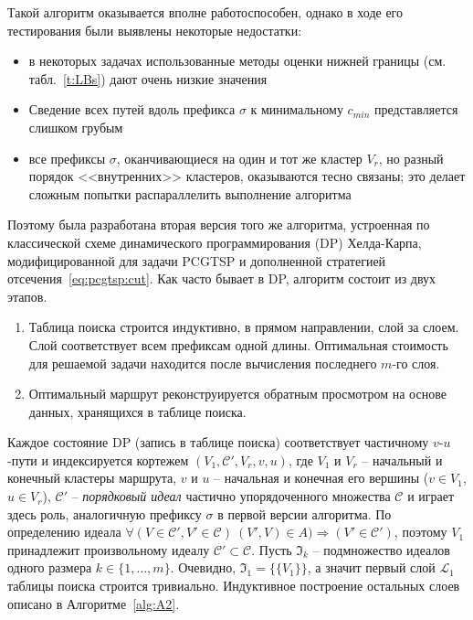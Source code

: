 Такой алгоритм оказывается вполне работоспособен,
однако в ходе его тестирования были выявлены некоторые недостатки:
\begin{itemize}
    \item
    в некоторых задачах использованные методы
    оценки нижней границы
    (см. табл.~\ref{t:LBs})
    дают очень низкие значения
    \item
    Сведение всех путей вдоль префикса $\sigma$
    к минимальному $c_{min}$
    представляется слишком грубым
    \item
    все префиксы $\sigma$,
    оканчивающиеся на один и тот же
    кластер $V_r$,
    но разный порядок <<внутренних>> кластеров,
    оказываются тесно связаны;
    это делает сложным попытки распараллелить
    выполнение алгоритма
\end{itemize}
Поэтому была разработана вторая версия того же алгоритма,
устроенная по классической схеме
динамического программирования (DP)
Хелда-Карпа,
модифицированной для задачи PCGTSP
и дополненной стратегией отсечения~\eqref{eq:pcgtsp:cut}.
Как часто бывает в DP,
алгоритм состоит из двух этапов.
\begin{enumerate}
  \item
  Таблица поиска строится индуктивно,
  в прямом направлении,
  слой за слоем.
  Слой соответствует всем префиксам одной длины.
  Оптимальная стоимость для решаемой задачи
  находится после вычисления последнего $m$-го слоя.
  \item
  Оптимальный маршрут реконструируется обратным просмотром
  на основе данных,
  хранящихся в таблице поиска.
\end{enumerate}

Каждое состояние DP
(запись в таблице поиска)
соответствует частичному
$v$-$u$-пути
и индексируется кортежем
$(V_1, \mathcal C',V_r,v, u)$, где
$V_1$ и $V_r$ -- начальный и конечный кластеры маршрута,
$v$ и $u$ -- начальная и конечная его вершины ($v\in V_1$, $u\in V_r$),
$\mathcal C'$ -- {\it порядковый идеал} частично упорядоченного множества $\mathcal C$
и играет здесь роль, аналогичную префиксу $\sigma$
в первой версии алгоритма.
По определению идеала
\(
    \forall (V\in\mathcal C', V'\in\mathcal C)\   (V',V)\in A)
    \Rightarrow (V'\in\mathcal C')
\),
поэтому $V_1$
принадлежит произвольному идеалу
$\mathcal C'\subset\mathcal C$.
Пусть $\mathfrak I_k$
-- подмножество идеалов одного размера
$k\in\{1,\ldots,m\}$.
Очевидно,
$\mathfrak I_1=\{\{V_1\}\}$,
а значит первый слой
$\mathcal L_1$
таблицы поиска строится тривиально.
Индуктивное построение остальных слоев
описано в Алгоритме~\ref{alg:A2}.

